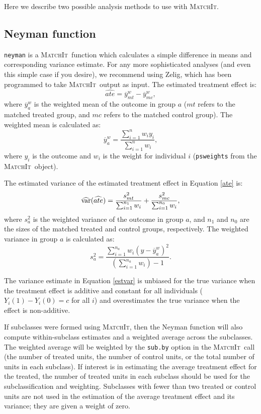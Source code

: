 \documentclass[oneside,letterpaper,titlepage]{article}
\newcommand{\MatchIt}{\textsc{MatchIt}}
\begin{document}
Here we describe two possible analysis methods to use with \MatchIt.

\subsection{Neyman function}

{\tt neyman} is a \MatchIt\ function which calculates a simple
difference in means and corresponding variance estimate.  For any more
sophisticated analyses (and even this simple case if you desire), we
recommend using Zelig, which has been programmed to take \MatchIt\ 
output as input.  The estimated treatment effect is:
\begin{equation}
\label{ate} 
\widehat{ate} = \overline{y}_{mt}^w-\overline{y}_{mc}^w,
\end{equation}
where $\overline{y}_a^w$ is the weighted mean of the outcome in group
$a$ ($mt$ refers to the matched treated group, and $mc$ refers to the
matched control group).  The weighted mean is calculated as:
$$\overline{y}_a^w = \frac{\sum_{i=1}^n w_i y_i}{\sum_{i=1}^n w_i},$$
where $y_i$ is the outcome and $w_i$ is the weight for individual $i$
({\tt psweights} from the \MatchIt\ object).

The estimated variance of the estimated treatment effect in Equation
\eqref{ate} is:
\begin{equation}
\label{estvar}
\widehat{{\rm var}}(\widehat{ate}) = \frac{s_{mt}^2}{\sum_{i=1}^{n_1} w_i} + \frac{s_{mc}^2}{\sum_{i=1}^{n_0} w_i},
\end{equation}
where $s_a^2$ is the weighted variance of the outcome in group $a$,
and $n_1$ and $n_0$ are the sizes of the matched treated and control
groups, respectively.  The weighted variance in group $a$ is
calculated as:
$$s^2_{a} = \frac{\sum_{i=1}^{n_a} w_i
  (y-\overline{y}_a^w)^2}{(\sum_{i=1}^{n_a} w_i) - 1}.$$

The variance estimate in Equation \eqref{estvar} is unbiased for the
true variance when the treatment effect is additive and constant for
all individuals ($Y_i(1)-Y_i(0)=c$ for all $i$) and overestimates the
true variance when the effect is non-additive.

If subclasses were formed using \MatchIt, then the Neyman function
will also compute within-subclass estimates and a weighted average
across the subclasses.  The weighted average will be weighted by the
{\tt sub.by} option in the \MatchIt\ call (the number of treated units,
the number of control units, or the total number of units in each
subclass).  If interest is in estimating the average treatment effect
for the treated, the number of treated units in each subclass should
be used for the subclassification and weighting.  Subclasses with
fewer than two treated or control units are not used in the estimation
of the average treatment effect and its variance; they are given a
weight of zero.
\end{document}
